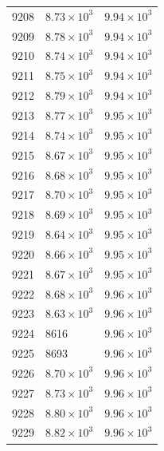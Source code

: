 \begin{table}[H]
\begin{tabular}{lll}
9208 & $\displaystyle 8.73 \times 10^{3}$ & $\displaystyle 9.94 \times 10^{3}$ \\
9209 & $\displaystyle 8.78 \times 10^{3}$ & $\displaystyle 9.94 \times 10^{3}$ \\
9210 & $\displaystyle 8.74 \times 10^{3}$ & $\displaystyle 9.94 \times 10^{3}$ \\
9211 & $\displaystyle 8.75 \times 10^{3}$ & $\displaystyle 9.94 \times 10^{3}$ \\
9212 & $\displaystyle 8.79 \times 10^{3}$ & $\displaystyle 9.94 \times 10^{3}$ \\
9213 & $\displaystyle 8.77 \times 10^{3}$ & $\displaystyle 9.95 \times 10^{3}$ \\
9214 & $\displaystyle 8.74 \times 10^{3}$ & $\displaystyle 9.95 \times 10^{3}$ \\
9215 & $\displaystyle 8.67 \times 10^{3}$ & $\displaystyle 9.95 \times 10^{3}$ \\
9216 & $\displaystyle 8.68 \times 10^{3}$ & $\displaystyle 9.95 \times 10^{3}$ \\
9217 & $\displaystyle 8.70 \times 10^{3}$ & $\displaystyle 9.95 \times 10^{3}$ \\
9218 & $\displaystyle 8.69 \times 10^{3}$ & $\displaystyle 9.95 \times 10^{3}$ \\
9219 & $\displaystyle 8.64 \times 10^{3}$ & $\displaystyle 9.95 \times 10^{3}$ \\
9220 & $\displaystyle 8.66 \times 10^{3}$ & $\displaystyle 9.95 \times 10^{3}$ \\
9221 & $\displaystyle 8.67 \times 10^{3}$ & $\displaystyle 9.95 \times 10^{3}$ \\
9222 & $\displaystyle 8.68 \times 10^{3}$ & $\displaystyle 9.96 \times 10^{3}$ \\
9223 & $\displaystyle 8.63 \times 10^{3}$ & $\displaystyle 9.96 \times 10^{3}$ \\
9224 & 8616 & $\displaystyle 9.96 \times 10^{3}$ \\
9225 & 8693 & $\displaystyle 9.96 \times 10^{3}$ \\
9226 & $\displaystyle 8.70 \times 10^{3}$ & $\displaystyle 9.96 \times 10^{3}$ \\
9227 & $\displaystyle 8.73 \times 10^{3}$ & $\displaystyle 9.96 \times 10^{3}$ \\
9228 & $\displaystyle 8.80 \times 10^{3}$ & $\displaystyle 9.96 \times 10^{3}$ \\
9229 & $\displaystyle 8.82 \times 10^{3}$ & $\displaystyle 9.96 \times 10^{3}$ \\

\end{tabular}
\end{table}
